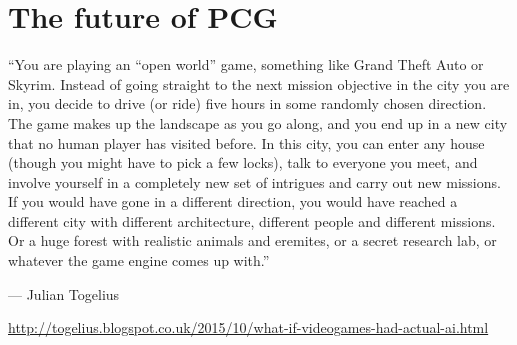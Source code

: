 \part{The future of PCG}
\frame{\partpage}

\begin{frame}
``You are playing an ``open world'' game, something like Grand Theft Auto or Skyrim.
Instead of going straight to the next mission objective in the city you are in,
you decide to drive (or ride) five hours in some randomly chosen direction.
The game makes up the landscape as you go along, and you end up in a new city that no human player has visited before.
In this city, you can enter any house (though you might have to pick a few locks), talk to everyone you meet,
and involve yourself in a completely new set of intrigues and carry out new missions.
If you would have gone in a different direction, you would have reached a different city
with different architecture, different people and different missions.
Or a huge forest with realistic animals and eremites, or a secret research lab, or whatever the game engine comes up with.''

--- Julian Togelius

{\tiny\url{http://togelius.blogspot.co.uk/2015/10/what-if-videogames-had-actual-ai.html}}
\end{frame}

